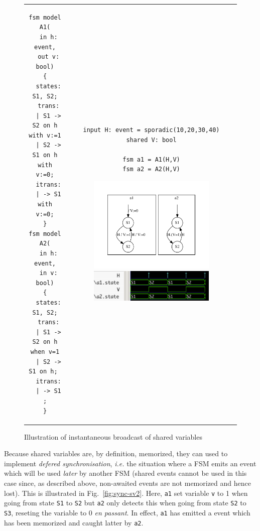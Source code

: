 \begin{figure}[h]
  \centering
\begin{tabular}[c]{cc}
  \begin{minipage}[b]{0.4\linewidth}
  \begin{lstlisting}[language=Rfsm]
fsm model A1(
  in h: event,
  out v: bool)
{
  states: S1, S2;
  trans:
  | S1 -> S2 on h with v:=1
  | S2 -> S1 on h with v:=0;
  itrans:
  | -> S1 with v:=0;
}
fsm model A2(
  in h: event,
  in v: bool)
{
  states: S1, S2;
  trans:
  | S1 -> S2 on h when v=1
  | S2 -> S1 on h; 
  itrans:
  | -> S1 ;
}
  \end{lstlisting}
  \end{minipage} &
  \begin{minipage}[b]{0.6\linewidth}
\begin{lstlisting}[language=Rfsm]
input H: event = sporadic(10,20,30,40)
shared V: bool

fsm a1 = A1(H,V)
fsm a2 = A2(H,V)
\end{lstlisting}
\includegraphics[width=0.7\textwidth]{figs/sync-sv1-model}
\includegraphics[width=0.7\textwidth]{figs/sync-sv1-chrono}
  \end{minipage}
\end{tabular}
  \caption{Illustration of instantaneous broadcast of shared variables}
  \label{fig:sync-sv1}
\end{figure}

\bigskip Because shared variables are, by definition, memorized, they can used to implement
\emph{defered synchronisation}, \emph{i.e.} the situation where a FSM emits an event which will be used
\emph{later} by another FSM (shared events cannot be used in this case since, as described above,
non-awaited events are not memorized and hence lost). This is illustrated in
Fig.~\ref{fig:sync-sv2}. Here, \texttt{a1} set variable \texttt{v} to 1 when going from state
\texttt{S1} to \texttt{S2} but \texttt{a2} only detects this when going from state \texttt{S2} to
\texttt{S3}, reseting the variable to 0 \emph{en passant}. In effect, \texttt{a1} has emitted a
event which has been memorized and caught latter by \texttt{a2}.

